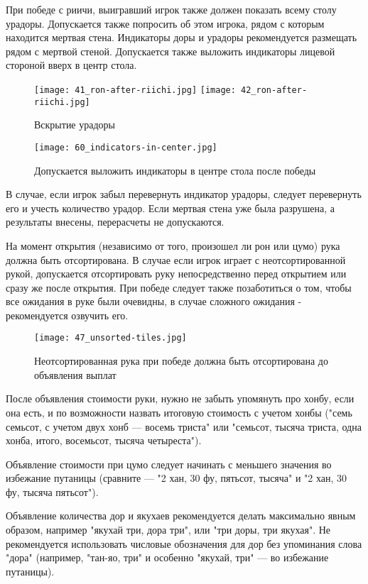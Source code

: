При победе с риичи, выигравший игрок также должен показать всему столу урадоры. Допускается также попросить об этом игрока, рядом с которым находится мертвая стена. Индикаторы доры и урадоры рекомендуется размещать рядом с мертвой стеной. Допускается также выложить индикаторы лицевой стороной вверх в центр стола.

\begin{figure}[H]
	\centering
	\texttt{[image: 41\_ron-after-riichi.jpg]}
	\texttt{[image: 42\_ron-after-riichi.jpg]}
	\caption{Вскрытие урадоры}
\end{figure}

\begin{figure}[H]
	\centering
	\texttt{[image: 60\_indicators-in-center.jpg]}
	\caption{Допускается выложить индикаторы в центре стола после победы}
\end{figure}

В случае, если игрок забыл перевернуть индикатор урадоры, следует перевернуть его и учесть количество урадор. Если мертвая стена уже была разрушена, а результаты внесены, перерасчеты не допускаются.

На момент открытия (независимо от того, произошел ли рон или цумо) рука должна быть отсортирована. В случае если игрок играет с неотсортированной рукой, допускается отсортировать руку непосредственно перед открытием или сразу же после открытия. При победе следует также позаботиться о том, чтобы все ожидания в руке были очевидны, в случае сложного ожидания - рекомендуется озвучить его.

\begin{figure}[H]
	\centering
	\texttt{[image: 47\_unsorted-tiles.jpg]}
	\caption{\centering Неотсортированная рука при победе \linebreak должна быть отсортирована до объявления выплат}
\end{figure}

После объявления стоимости руки, нужно не забыть упомянуть про хонбу, если она есть, и по возможности назвать итоговую стоимость с учетом хонбы ("семь семьсот, с учетом двух хонб --- восемь триста" или "семьсот, тысяча триста, одна хонба, итого, восемьсот, тысяча четыреста").

Объявление стоимости при цумо следует начинать с меньшего значения во избежание путаницы (сравните --- "2 хан, 30 фу, пятьсот, тысяча" и "2 хан, 30 фу, тысяча пятьсот").

Объявление количества дор и якухаев рекомендуется делать максимально явным образом, например "якухай три, дора три", или "три доры, три якухая". Не рекомендуется использовать числовые обозначения для дор без упоминания слова "дора" (например, "тан-яо, три" и особенно "якухай, три" --- во избежание путаницы).

